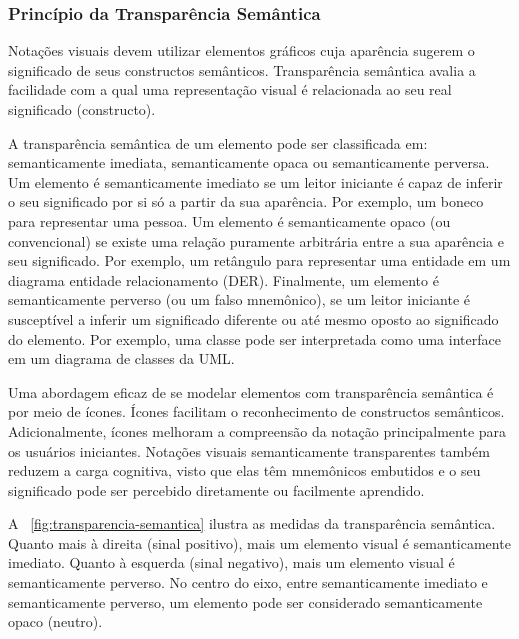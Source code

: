 \subsubsection{Princípio da Transparência Semântica}\label{2-fundamentacao-notacao-visual-principio-transparencia-semantica}

Notações visuais devem utilizar elementos gráficos cuja aparência sugerem o significado de seus constructos semânticos. Transparência semântica avalia a facilidade com a qual uma representação visual é relacionada ao seu real significado (constructo).

A transparência semântica de um elemento pode ser classificada em: semanticamente imediata, semanticamente opaca ou semanticamente perversa. Um elemento é semanticamente imediato se um leitor iniciante é capaz de inferir o seu significado por si só a partir da sua aparência. Por exemplo, um boneco para representar uma pessoa. Um elemento é semanticamente opaco (ou convencional) se existe uma relação puramente arbitrária entre a sua aparência e seu significado. Por exemplo, um retângulo para representar uma entidade em um diagrama entidade relacionamento (DER). Finalmente, um elemento é semanticamente perverso (ou um falso mnemônico), se um leitor iniciante é susceptível a inferir um significado diferente ou até mesmo oposto ao significado do elemento. Por exemplo, uma classe pode ser interpretada como uma interface em um diagrama de classes da UML.

Uma abordagem eficaz de se modelar elementos com transparência semântica é por meio de ícones. Ícones facilitam o reconhecimento de constructos semânticos. Adicionalmente, ícones melhoram a compreensão da notação principalmente para os usuários iniciantes. Notações visuais semanticamente transparentes também reduzem a carga cognitiva, visto que elas têm mnemônicos embutidos e o seu significado pode ser percebido diretamente ou facilmente aprendido.

A \figurename~\ref{fig:transparencia-semantica} ilustra as medidas da transparência semântica. Quanto mais à direita (sinal positivo), mais um elemento visual é semanticamente imediato. Quanto à esquerda (sinal negativo), mais um elemento visual é semanticamente perverso. No centro do eixo, entre semanticamente imediato e semanticamente perverso, um elemento pode ser considerado semanticamente opaco (neutro).

